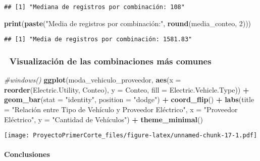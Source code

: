 \documentclass[
]{article}
\newenvironment{Shaded}{\begin{snugshade}}{\end{snugshade}}
\newcommand{\AttributeTok}[1]{\textcolor[rgb]{0.13,0.29,0.53}{#1}}
\newcommand{\CommentTok}[1]{\textcolor[rgb]{0.56,0.35,0.01}{\textit{#1}}}
\newcommand{\DecValTok}[1]{\textcolor[rgb]{0.00,0.00,0.81}{#1}}
\newcommand{\FunctionTok}[1]{\textcolor[rgb]{0.13,0.29,0.53}{\textbf{#1}}}
\newcommand{\NormalTok}[1]{#1}
\newcommand{\SpecialCharTok}[1]{\textcolor[rgb]{0.81,0.36,0.00}{\textbf{#1}}}
\newcommand{\StringTok}[1]{\textcolor[rgb]{0.31,0.60,0.02}{#1}}
\begin{document}
\begin{verbatim}
## [1] "Mediana de registros por combinación: 108"
\end{verbatim}

\begin{Shaded}
\begin{Highlighting}[]
\FunctionTok{print}\NormalTok{(}\FunctionTok{paste}\NormalTok{(}\StringTok{"Media de registros por combinación:"}\NormalTok{, }\FunctionTok{round}\NormalTok{(media\_conteo, }\DecValTok{2}\NormalTok{)))}
\end{Highlighting}
\end{Shaded}

\begin{verbatim}
## [1] "Media de registros por combinación: 1581.83"
\end{verbatim}

\subsubsection{🔹 Visualización de las combinaciones más
comunes}\label{visualizaciuxf3n-de-las-combinaciones-muxe1s-comunes}

\begin{Shaded}
\begin{Highlighting}[]
\CommentTok{\#windows()}
\FunctionTok{ggplot}\NormalTok{(moda\_vehiculo\_proveedor, }\FunctionTok{aes}\NormalTok{(}\AttributeTok{x =} \FunctionTok{reorder}\NormalTok{(Electric.Utility, Conteo), }\AttributeTok{y =}\NormalTok{ Conteo, }\AttributeTok{fill =}\NormalTok{ Electric.Vehicle.Type)) }\SpecialCharTok{+}
  \FunctionTok{geom\_bar}\NormalTok{(}\AttributeTok{stat =} \StringTok{"identity"}\NormalTok{, }\AttributeTok{position =} \StringTok{"dodge"}\NormalTok{) }\SpecialCharTok{+}
  \FunctionTok{coord\_flip}\NormalTok{() }\SpecialCharTok{+}
  \FunctionTok{labs}\NormalTok{(}\AttributeTok{title =} \StringTok{"Relación entre Tipo de Vehículo y Proveedor Eléctrico"}\NormalTok{,}
       \AttributeTok{x =} \StringTok{"Proveedor Eléctrico"}\NormalTok{,}
       \AttributeTok{y =} \StringTok{"Cantidad de Vehículos"}\NormalTok{) }\SpecialCharTok{+}
  \FunctionTok{theme\_minimal}\NormalTok{()}
\end{Highlighting}
\end{Shaded}

\texttt{[image: ProyectoPrimerCorte\_files/figure-latex/unnamed-chunk-17-1.pdf]}

\paragraph{\texorpdfstring{\textbf{Conclusiones}}{Conclusiones}}\label{conclusiones}
\end{document}

